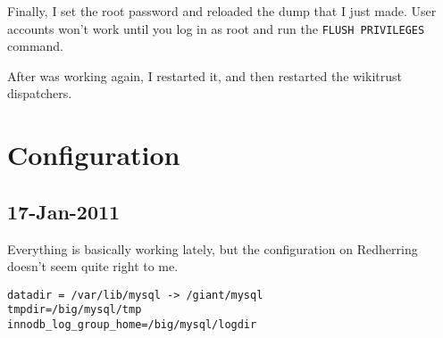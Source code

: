 Finally, I set the root password and reloaded the dump that I just made.
User accounts won't work until you log in as root and run
the \texttt{FLUSH PRIVILEGES} command.

After \mysql was working again, I restarted it, and then
restarted the wikitrust dispatchers.

\section{Configuration}

\subsection{17-Jan-2011}

Everything is basically working lately, but the configuration
on Redherring doesn't seem quite right to me.
\begin{verbatim}
datadir = /var/lib/mysql -> /giant/mysql
tmpdir=/big/mysql/tmp
innodb_log_group_home=/big/mysql/logdir
\end{verbatim}

